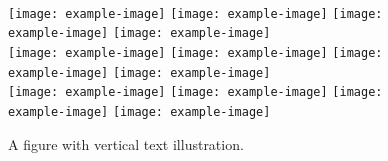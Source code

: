 \begin{figure}[t] \centering
    \makebox[0.01\textwidth]{}
    \\
    \texttt{[image: example-image]}
    \texttt{[image: example-image]}
    \texttt{[image: example-image]}
    \texttt{[image: example-image]}
    \\
    \texttt{[image: example-image]}
    \texttt{[image: example-image]}
    \texttt{[image: example-image]}
    \texttt{[image: example-image]}
    \\
    \texttt{[image: example-image]}
    \texttt{[image: example-image]}
    \texttt{[image: example-image]}
    \texttt{[image: example-image]}
    \\
    \caption{A figure with vertical text illustration.} 
    \label{fig:teaser}
\end{figure}

